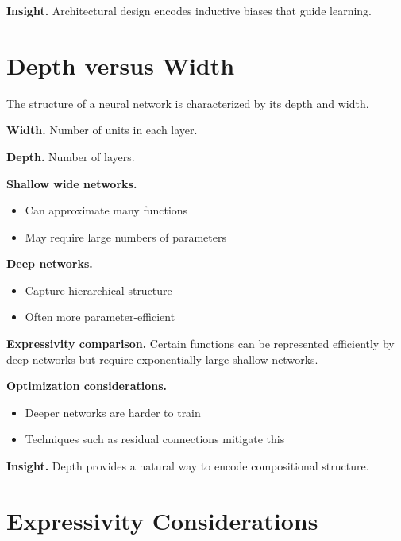 \medskip

\noindent
\textbf{Insight.}  
Architectural design encodes inductive biases that guide learning.

\section{Depth versus Width}

The structure of a neural network is characterized by its depth and width.

\medskip

\noindent
\textbf{Width.}  
Number of units in each layer.

\medskip

\noindent
\textbf{Depth.}  
Number of layers.

\medskip

\noindent
\textbf{Shallow wide networks.}
\begin{itemize}
    \item Can approximate many functions
    \item May require large numbers of parameters
\end{itemize}

\medskip

\noindent
\textbf{Deep networks.}
\begin{itemize}
    \item Capture hierarchical structure
    \item Often more parameter-efficient
\end{itemize}

\medskip

\noindent
\textbf{Expressivity comparison.}  
Certain functions can be represented efficiently by deep networks but require exponentially large shallow networks.

\medskip

\noindent
\textbf{Optimization considerations.}
\begin{itemize}
    \item Deeper networks are harder to train
    \item Techniques such as residual connections mitigate this
\end{itemize}

\medskip

\noindent
\textbf{Insight.}  
Depth provides a natural way to encode compositional structure.

\section{Expressivity Considerations}

